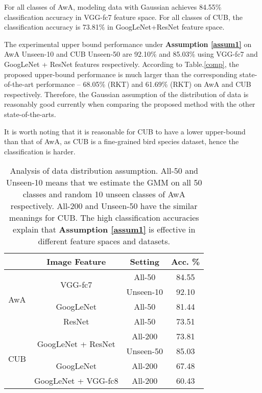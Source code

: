 \documentclass{article}
\begin{document}
For all classes of AwA, modeling data with Gaussian achieves 84.55\% classification accuracy in VGG-fc7 feature space. For all classes of CUB, the classification accuracy is 73.81\% in GoogLeNet+ResNet feature space.

The experimental upper bound performance under \textbf{Assumption \ref{assum1}} on AwA Unseen-10 and CUB Unseen-50 are 92.10\% and 85.03\% using VGG-fc7 and GoogLeNet + ResNet features respectively. According to Table.\ref{comp}, the proposed upper-bound performance is much larger than the corresponding state-of-the-art performance \--- 68.05\% (RKT) and 61.69\% (RKT) on AwA and CUB respectively. Therefore, the Gaussian assumption of the distribution of data is reasonably good currently when comparing the proposed method with the other state-of-the-arts.

It is worth noting that it is reasonable for CUB to have a lower upper-bound than that of AwA, as CUB is a fine-grained bird species dataset, hence the classification is harder.

\begin{table}[ht]
\centering

\begin{tabular}{c|c|c|c}
\hline
\multicolumn{1}{c|}{} & \multicolumn{1}{c|}{Image Feature} & \multicolumn{1}{c|}{Setting} & Acc. \% \\ \hline
\multirow{4}{*}{AwA}  & \multirow{2}{*}{VGG-fc7}       & All-50                       & 84.55       \\ \cline{3-4}
                      &                              & Unseen-10                    & 92.10       \\ \cline{2-4}
                      & GoogLeNet                    & All-50                       & 81.44       \\ \cline{2-4}
                      & ResNet                          & All-50                       & 73.51       \\ \hline
\multirow{4}{*}{CUB}  & \multirow{2}{*}{GoogLeNet + ResNet}           & All-200                       & 73.81       \\ \cline{3-4}
                      &                              & Unseen-50                    & 85.03       \\ \cline{2-4}
                      & {GoogLeNet}   & All-200                       & 67.48       \\ \cline{2-4}
                      & GoogLeNet + VGG-fc8           & All-200                       & 60.43       \\ \hline
\end{tabular}
\caption{Analysis of data distribution assumption. All-50 and Unseen-10 means that we estimate the GMM on all 50 classes and random 10 unseen classes of AwA respectively. All-200 and Unseen-50 have the similar meanings for CUB. The high classification accuracies explain that \textbf{Assumption \ref{assum1}} is effective in different feature spaces and datasets.}
\label{tab:assum1}
\end{table}
\end{document}
